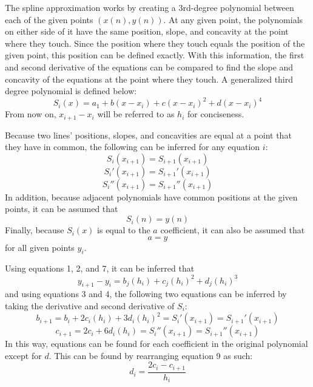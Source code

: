 \documentclass[12pt, letterpaper]{article} %
\begin{document}
The spline approximation works by creating a 3rd-degree polynomial between each of the given points \((x(n), y(n))\). At any given point, the polynomials on either side of it have the same position, slope, and concavity at the point where they touch. Since the position where they touch equals the position of the given point, this position can be defined exactly. With this information, the first and second derivative of the equations can be compared to find the slope and concavity of the equations at the point where they touch. A generalized third degree polynomial is defined below:
\begin{equation}
S_i(x) = a_1 + b(x - x_i) + c(x - x_i)^2 + d(x - x_i)^4
\end{equation}
From now on, \(x_{i + 1} - x_i\) will be referred to as \(h_i\) for conciseness.

Because two lines' positions, slopes, and concavities are equal at a point that they have in common, the following can be inferred for any equation \(i\):
\begin{equation}
S_i(x_{i+1}) = S_{i+1}(x_{i+1})
\end{equation}
\begin{equation}
S_i'(x_{i+1}) = S_{i+1}'(x_{i+1})
\end{equation}
\begin{equation}
S_i''(x_{i+1}) = S_{i+1}''(x_{i+1})
\end{equation}
In addition, because adjacent polynomials have common positions at the given points, it can be assumed that
\begin{equation}
S_i(n) = y(n)
\end{equation}
Finally, because \(S_i(x)\) is equal to the \(a\) coefficient, it can also be assumed that
\begin{equation}
a = y
\end{equation}
for all given points \(y_i\).

Using equations 1, 2, and 7, it can be inferred that
\begin{equation}
y_{i + 1} - y_i =  b_j(h_i) + c_j(h_i)^2 + d_j(h_i)^3
\end{equation}
and using equations 3 and 4, the following two equations can be inferred by taking the derivative and second derivative of \(S_i\):
\begin{equation}
b_{i + 1} = b_i + 2c_i(h_i) + 3d_i(h_i)^2 = S_i'(x_{i + 1}) = S_{i + 1}'(x_{i + 1})
\end{equation}
\begin{equation}
c_{i + 1} = 2c_i + 6d_i(h_i) = S_i''(x_{i + 1}) = S_{i + 1}''(x_{i + 1})
\end{equation}
In this way, equations can be found for each coefficient in the original polynomial except for \(d\). This can be found by rearranging equation 9 as such:
\begin{equation}
d_i = \dfrac{2c_i - c_{i + 1}}{h_i}
\end{equation}
\end{document}
